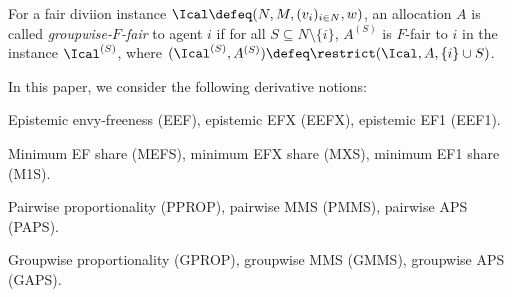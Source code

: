 \begin{definition}
\label{defn:groupwise}
For a fair diviion instance $\Ical \defeq (N, M, (v_i)_{i \in N}, w)$,
an allocation $A$ is called \emph{groupwise-$F$-fair} to agent $i$ if
for all $S \subseteq N \setminus \{i\}$, $A^{(S)}$ is $F$-fair to $i$ in the instance $\Ical^{(S)}$,
where $(\Ical^{(S)}, A^{(S)}) \defeq \restrict(\Ical, A, \{i\} \cup S)$.
\end{definition}

In this paper, we consider the following derivative notions:
\begin{tightenum}
\item Epistemic envy-freeness (EEF), epistemic EFX (EEFX), epistemic EF1 (EEF1).
\item Minimum EF share (MEFS), minimum EFX share (MXS), minimum EF1 share (M1S).
\item Pairwise proportionality (PPROP), pairwise MMS (PMMS), pairwise APS (PAPS).
\item Groupwise proportionality (GPROP), groupwise MMS (GMMS), groupwise APS (GAPS).
\end{tightenum}
